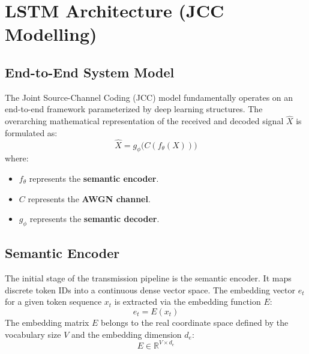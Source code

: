 \documentclass[12pt, a4paper, twocolumn]{article}
\begin{document}
\section{\large \textbf{LSTM Architecture (JCC Modelling)}}

\subsection{\textbf{End-to-End System Model}}
The Joint Source-Channel Coding (JCC) model fundamentally operates on an end-to-end framework parameterized by deep learning structures. The overarching mathematical representation of the received and decoded signal $\hat{X}$ is formulated as:
\begin{equation}
    \hat{X} = g_\phi \big( C(f_\theta(X)) \big)
\end{equation}
where:
\begin{itemize}
    \item $f_\theta$ represents the \textbf{semantic encoder}.
    \item $C$ represents the \textbf{AWGN channel}.
    \item $g_\phi$ represents the \textbf{semantic decoder}.
\end{itemize}

\subsection{\textbf{Semantic Encoder}}
The initial stage of the transmission pipeline is the semantic encoder. It maps discrete token IDs into a continuous dense vector space. The embedding vector $e_t$ for a given token sequence $x_t$ is extracted via the embedding function $E$:
\begin{equation}
    e_t = E(x_t)
\end{equation}
The embedding matrix $E$ belongs to the real coordinate space defined by the vocabulary size $V$ and the embedding dimension $d_e$:
\begin{equation}
    E \in \mathbb{R}^{V \times d_e}
\end{equation}
\end{document}
